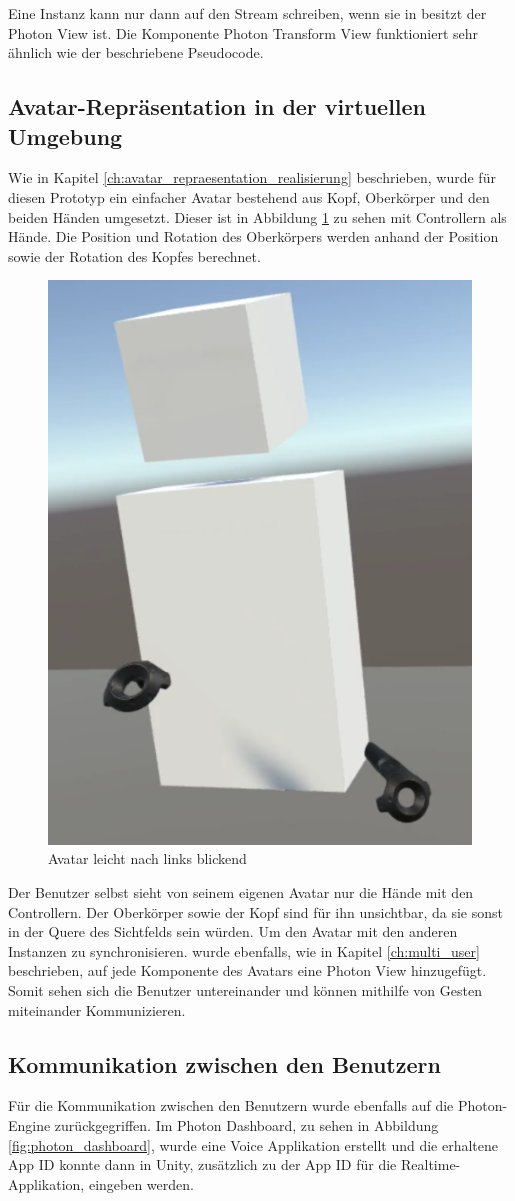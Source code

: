 Eine Instanz kann nur dann auf den Stream schreiben, wenn sie in besitzt der Photon View ist. Die Komponente Photon Transform View funktioniert sehr ähnlich wie der beschriebene Pseudocode.

\subsection{Avatar-Repräsentation in der virtuellen Umgebung}

Wie in Kapitel \ref{ch:avatar_repraesentation_realisierung} beschrieben, wurde für diesen Prototyp ein einfacher Avatar bestehend aus Kopf, Oberkörper und den beiden Händen umgesetzt. Dieser ist in Abbildung \ref{fig:avatar} zu sehen mit Controllern als Hände. Die Position und Rotation des Oberkörpers werden anhand der Position sowie der Rotation des Kopfes berechnet.

\begin{figure}[h!]
	\centering
	\includegraphics[keepaspectratio,width=0.35\linewidth]{img/Avatar.PNG}
	\caption{Avatar leicht nach links blickend}
	\label{fig:avatar}
\end{figure} 

Der Benutzer selbst sieht von seinem eigenen Avatar nur die Hände mit den Controllern. Der Oberkörper sowie der Kopf sind für ihn unsichtbar, da sie sonst in der Quere des Sichtfelds sein würden. Um den Avatar mit den anderen Instanzen zu synchronisieren. wurde ebenfalls, wie in Kapitel \ref{ch:multi_user} beschrieben, auf jede Komponente des Avatars eine Photon View hinzugefügt. Somit sehen sich die Benutzer untereinander und können mithilfe von Gesten miteinander Kommunizieren.

\subsection{Kommunikation zwischen den Benutzern}
\label{ch:kommunikation_zwischen_benutzern_realisierung}
Für die Kommunikation zwischen den Benutzern wurde ebenfalls auf die Photon-Engine zurückgegriffen. Im Photon Dashboard, zu sehen in Abbildung \ref{fig:photon_dashboard}, wurde eine Voice Applikation erstellt und die erhaltene App ID konnte dann in Unity, zusätzlich zu der App ID für die Realtime-Applikation, eingeben werden. \\

